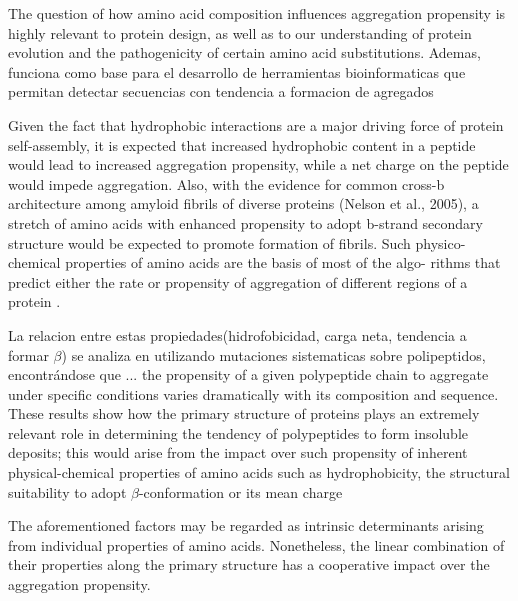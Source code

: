 The question of how amino acid composition influences aggregation propensity is highly relevant to protein design, as well as
to our understanding of protein evolution and the pathogenicity of certain amino acid substitutions.
Ademas, funciona como base para el desarrollo de herramientas bioinformaticas que permitan detectar secuencias con tendencia a formacion de agregados


Given the fact that hydrophobic
interactions are a major driving force of protein self-assembly, it is
expected that increased hydrophobic content in a peptide would
lead to increased aggregation propensity, while a net charge on
the peptide would impede aggregation. Also, with the evidence
for common cross-b architecture among amyloid fibrils of diverse
proteins (Nelson et al., 2005), a stretch of amino acids with
enhanced propensity to adopt b-strand secondary structure
would be expected to promote formation of fibrils. Such physico-
chemical properties of amino acids are the basis of most of the algo-
rithms that predict either the rate or propensity of aggregation of
different regions of a protein .  %

La relacion entre estas propiedades(hidrofobicidad, carga neta, tendencia a formar $\beta$) se analiza en  \cite{chiti2003rationalization} utilizando mutaciones sistematicas sobre polipeptidos,
encontrándose que ... the propensity of a  given  polypeptide  chain  to  aggregate  under  specific  conditions varies  dramatically  with  its  composition  and  sequence.
These results show how the primary structure of proteins plays an extremely relevant role in determining the tendency of polypeptides to form insoluble deposits;
this would arise from the impact over such propensity of inherent physical-chemical properties of amino acids such as hydrophobicity, the
structural suitability to adopt $\beta$-conformation or its mean charge

The aforementioned factors may be regarded as intrinsic determinants arising
from individual properties of amino acids. Nonetheless, the linear combination
of their properties along the primary structure has a cooperative impact over the
aggregation propensity. 




